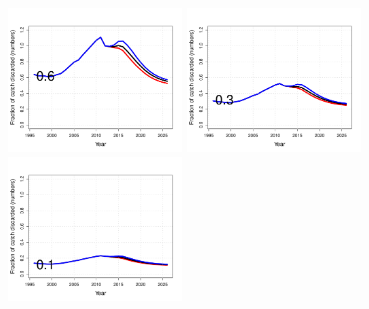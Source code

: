 \begin{figure}[htbp]
	\centering
		\includegraphics[height=1.5in]{../FIGURES/SIZELIMIT/fig_32_DI_dt.pdf}
		\includegraphics[height=1.5in]{../FIGURES/SIZELIMIT/fig_29_DI_dt.pdf}
		\includegraphics[height=1.5in]{../FIGURES/SIZELIMIT/fig_26_DI_dt.pdf}
		                                                              

\end{figure}
